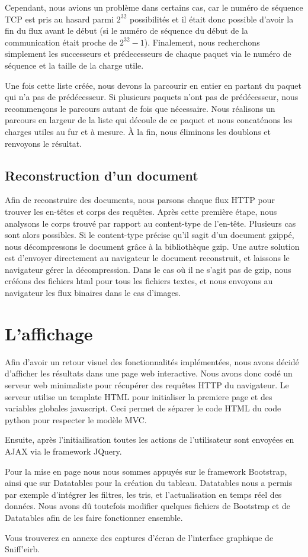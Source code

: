 Cependant, nous avions un problème dans certains cas, car le numéro de séquence TCP est pris au hasard parmi $2^{32}$ possibilités et il était donc possible d'avoir la fin du flux 
avant le début (si le numéro de séquence du début de la communication était proche de $2^{32} -1$). Finalement, nous recherchons simplement les successeurs et prédecesseurs de chaque
paquet via le numéro de séquence et la taille de la charge utile.

Une fois cette liste créée, nous devons la parcourir en entier en partant du paquet qui n'a pas de prédécesseur. Si plusieurs paquets n'ont pas de prédécesseur, nous recommençons le parcours autant de fois que nécessaire. Nous réalisons un parcours en largeur de la liste qui découle de ce paquet et nous concaténons les charges utiles au fur et à mesure. À la fin, nous éliminons les doublons et renvoyons le résultat.


\subsection{Reconstruction d'un document}

Afin de reconstruire des documents, nous parsons chaque flux HTTP pour trouver les en-têtes et corps des requêtes. Après cette première étape, nous analysons le corps trouvé par rapport au content-type de l'en-tête.
Plusieurs cas sont alors possibles. Si le content-type précise qu'il sagit d'un document gzippé, nous décompressons le document grâce à la bibliothèque gzip. Une autre solution est d'envoyer directement au navigateur le document reconstruit, et laissons le navigateur gérer la décompression.
Dans le cas où il ne s'agit pas de gzip, nous crééons des fichiers html pour tous les fichiers textes, et nous envoyons au navigateur les flux binaires dans le cas d'images.



\section{L'affichage}
Afin d'avoir un retour visuel des fonctionnalités implémentées, nous avons décidé d'afficher les résultats dans une page web interactive. 
Nous avons donc codé un serveur web minimaliste pour récupérer des requêtes HTTP du navigateur. Le serveur utilise un template HTML pour
initialiser la premiere page et des variables globales javascript. Ceci permet de séparer le code HTML du code python pour respecter le modèle MVC.

Ensuite, après l'initiailisation toutes les actions de l'utilisateur sont envoyées en AJAX via le framework JQuery.

Pour la mise en page nous nous sommes appuyés sur le framework Bootstrap, ainsi que sur Datatables pour la création du tableau. Datatables nous a
permis par exemple d'intégrer les filtres, les tris, et l'actualisation en temps réel des données. 
Nous avons dû toutefois modifier quelques fichiers de Bootstrap et de Datatables afin de les faire fonctionner ensemble.


Vous trouverez en annexe des captures d'écran de l'interface graphique de Sniff'eirb.

